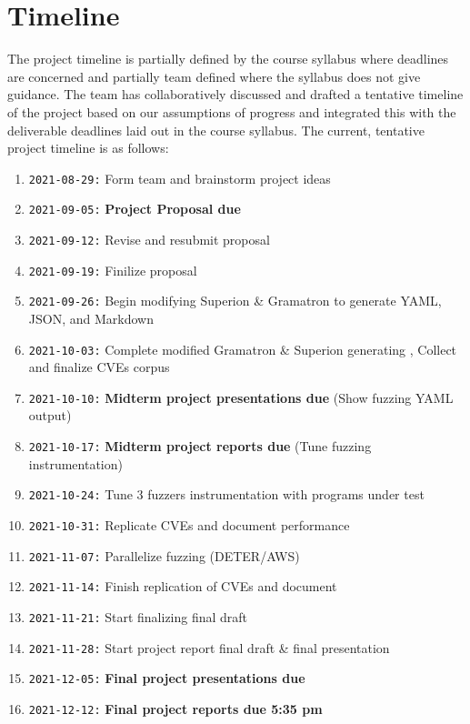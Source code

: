 \documentclass[12pt]{diazessay}
\begin{document}
\clearpage
\section*{Timeline}

The project timeline is partially defined by the course syllabus where deadlines are concerned and partially team defined where the syllabus does not give guidance.
The team has collaboratively discussed and drafted a tentative timeline of the project based on our assumptions of progress and integrated this with the deliverable deadlines laid out in the course syllabus. The current, tentative project timeline is as follows:

\begin{enumerate}[label={}]
	\item \texttt{2021-08-29:} Form team and brainstorm project ideas
	\item \texttt{2021-09-05:} \textbf{Project Proposal due}
	\item \texttt{2021-09-12:} Revise and resubmit proposal
	\item \texttt{2021-09-19:} Finilize proposal
	\item \texttt{2021-09-26:} Begin modifying Superion \& Gramatron to generate YAML, JSON, and Markdown
	\item \texttt{2021-10-03:} Complete modified Gramatron \& Superion generating , Collect and finalize CVEs corpus
	\item \texttt{2021-10-10:} \textbf{Midterm project presentations due} \hfill (Show fuzzing YAML output)
	\item \texttt{2021-10-17:} \textbf{Midterm project reports due} \hfill (Tune fuzzing instrumentation)
	\item \texttt{2021-10-24:} Tune 3 fuzzers instrumentation with programs under test
	\item \texttt{2021-10-31:} Replicate CVEs and document performance
	\item \texttt{2021-11-07:} Parallelize fuzzing \hfill (DETER/AWS)
	\item \texttt{2021-11-14:} Finish replication of CVEs and document
	\item \texttt{2021-11-21:} Start finalizing final draft
	\item \texttt{2021-11-28:} Start project report final draft \& final presentation
	\item \texttt{2021-12-05:} \textbf{Final project presentations due}
	\item \texttt{2021-12-12:} \textbf{Final project reports due 5:35 pm}
\end{enumerate}


\clearpage


\end{document}
